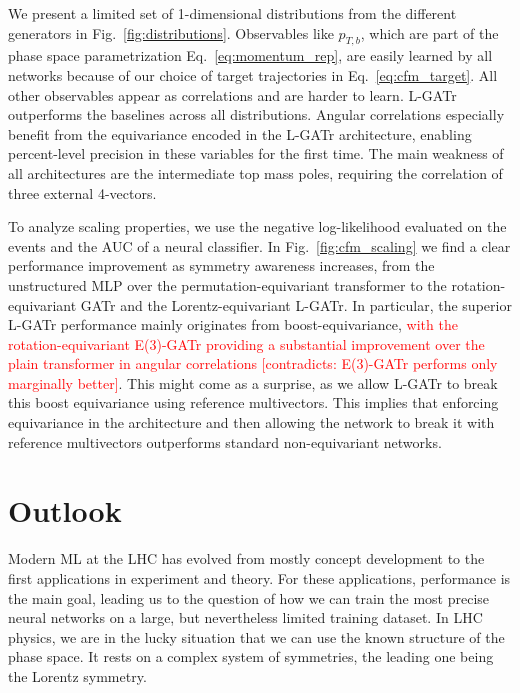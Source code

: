 \documentclass[submission, Phys]{SciPost}
\begin{document}
We present a limited set of 1-dimensional distributions from the different generators in Fig.~\ref{fig:distributions}. Observables like $p_{T,b}$, which are part of the phase space parametrization Eq.~\eqref{eq:momentum_rep}, are easily learned by all networks because of our choice of target trajectories in Eq.~\eqref{eq:cfm_target}. All other observables appear as correlations and are harder to learn. L-GATr outperforms the baselines across all distributions. Angular correlations especially benefit from the equivariance encoded in the L-GATr architecture, enabling percent-level precision in these variables for the first time. The main weakness of all architectures are the intermediate top mass poles, requiring the correlation of three external 4-vectors.

To analyze scaling properties, we use the negative log-likelihood evaluated on the events and the AUC of a neural classifier. In Fig.~\ref{fig:cfm_scaling} we find a clear performance improvement as symmetry awareness increases, from the unstructured MLP over the permutation-equivariant transformer to the rotation-equivariant GATr and the Lorentz-equivariant L-GATr. In particular, the superior L-GATr performance mainly originates from boost-equivariance, \textcolor{red}{with the rotation-equivariant E(3)-GATr providing a substantial improvement over the plain transformer in angular correlations [contradicts: E(3)-GATr performs only marginally better]}. This might come as a surprise, as we allow L-GATr to break this boost equivariance using reference multivectors. This implies that enforcing equivariance in the architecture and then allowing the network to break it with reference multivectors outperforms standard non-equivariant networks.

\section{Outlook}
\label{sec:outlook}

Modern ML at the LHC has evolved from mostly concept development to the first applications in experiment and theory. For these applications, performance is the main goal, leading us to the question of how we can train the most precise neural networks on a large, but nevertheless limited training dataset. In LHC physics, we are in the lucky situation that we can use the known structure of the phase space. It rests on a complex system of symmetries, the leading one being the Lorentz symmetry.
\end{document}
